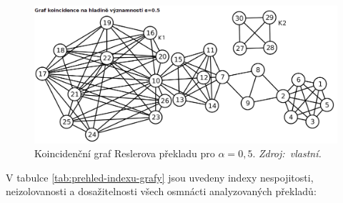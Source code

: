 \documentclass[dp.tex]{subfiles}
\begin{document}
\begin{figure}[H]
	\centering
	\includegraphics[max width=\textwidth,keepaspectratio=true]{imgs-70-prakticka/denotation-resler-05}
	\caption[Koincidenční graf Reslerova překladu pro $\alpha = 0{,}5$.]{Koincidenční graf Reslerova překladu pro $\alpha = 0{,}5$. \textit{Zdroj:~vlastní.}}
	\label{fig:denotation-resler-007}
\end{figure}

V tabulce \ref{tab:prehled-indexu-grafy} jsou uvedeny indexy nespojitosti, neizolovanosti a dosažitelnosti všech osmnácti analyzovaných překladů:
\end{document}
